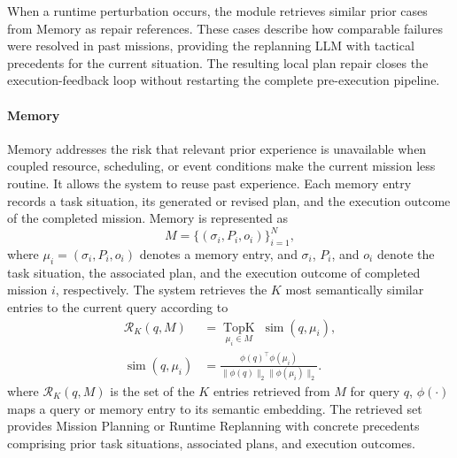 When a runtime perturbation occurs, the module retrieves similar prior cases
from Memory as repair references.
These cases describe how comparable failures were resolved in past missions,
providing the replanning LLM with tactical precedents for the current situation.
The resulting local plan repair closes the execution-feedback loop without
restarting the complete pre-execution pipeline.

\paragraph{Memory} Memory addresses the risk that relevant prior experience is
unavailable when coupled resource, scheduling, or event conditions make the
current mission less routine. It allows the system to reuse past experience.
Each memory entry records a task situation, its generated or revised plan, and
the execution outcome of the completed mission. Memory is represented as
\begin{equation}
M=\{(\sigma_i,P_i,o_i)\}_{i=1}^{N},
\label{eq:memory-store}
\end{equation}
where $\mu_i=(\sigma_i,P_i,o_i)$ denotes a memory entry, and $\sigma_i$, $P_i$, and
$o_i$ denote the task situation, the associated plan, and the execution outcome
of completed mission $i$, respectively. The system retrieves
the $K$ most semantically similar entries to the current query according to
\begin{equation}
\begin{aligned}
\mathcal{R}_K(q,M)
&=\underset{\mu_i\in M}{\operatorname{TopK}}\;
  \operatorname{sim}(q,\mu_i),\\
\operatorname{sim}(q,\mu_i)
&=\frac{\phi(q)^\top\phi(\mu_i)}
{\lVert\phi(q)\rVert_2\lVert\phi(\mu_i)\rVert_2}.
\end{aligned}
\label{eq:semantic-memory-retrieval}
\end{equation}
where $\mathcal{R}_K(q,M)$ is the set of the $K$ entries retrieved from $M$ for
query $q$, $\phi(\cdot)$ maps a query or memory entry to its semantic embedding. 
The retrieved set provides Mission Planning or Runtime Replanning with concrete
precedents comprising prior task situations, associated plans, and execution
outcomes.

\endinput
